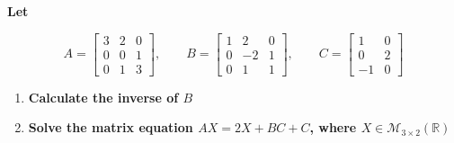 \item \textbf{Let}

$$
A=
\begin{bmatrix}
    3 & 2 & 0\\
    0 & 0 & 1\\
    0 & 1 & 3
\end{bmatrix},
\qquad
B=
\begin{bmatrix}
    1 & 2 & 0\\
    0 & -2 & 1\\
    0 & 1 & 1
\end{bmatrix},
\qquad
C=
\begin{bmatrix}
    1 & 0\\
    0 & 2\\
    -1 & 0
\end{bmatrix}
$$

\begin{enumerate}[label=\alph*)]

    \item \textbf{Calculate the inverse of $B$}
    

    \item \textbf{Solve the matrix equation
    $AX=2X+BC+C$, where
    $X\in\mathcal{M}_{3\times2}(\mathbb{R})$}

    

\end{enumerate}
